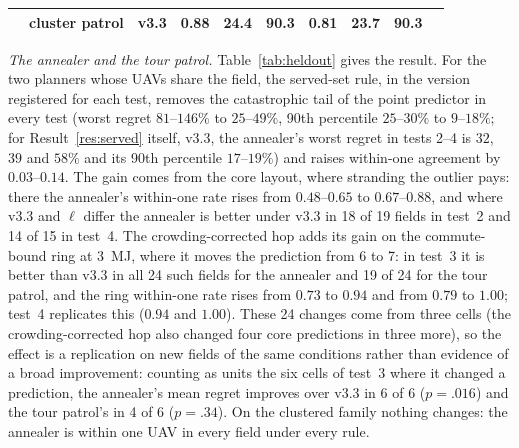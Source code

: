 \documentclass[journal,outdir=./]{IEEEtran}
\begin{document}
\begin{table}[t]
\begin{tabular}{lll rrr rrr l}
 & cluster patrol & v3.3 & 0.88 & 24.4 & 90.3 & 0.81 & 23.7 & 90.3 & \\
\bottomrule
\end{tabular}
\par{}
\end{table}

\textit{The annealer and the tour patrol.} Table~\ref{tab:heldout} gives the result. For the two planners whose UAVs share the field, the served-set rule, in the version registered for each test, removes the catastrophic tail of the point predictor in every test (worst regret $81$--$146\%$ to $25$--$49\%$, 90th percentile $25$--$30\%$ to $9$--$18\%$; for Result~\ref{res:served} itself, v3.3, the annealer's worst regret in tests 2--4 is $32$, $39$ and $58\%$ and its 90th percentile $17$--$19\%$) and raises within-one agreement by $0.03$--$0.14$. The gain comes from the core layout, where stranding the outlier pays: there the annealer's within-one rate rises from $0.48$--$0.65$ to $0.67$--$0.88$, and where v3.3 and $\ell$ differ the annealer is better under v3.3 in 18 of 19 fields in test~2 and 14 of 15 in test~4. The crowding-corrected hop adds its gain on the commute-bound ring at 3~MJ, where it moves the prediction from 6 to 7: in test~3 it is better than v3.3 in all 24 such fields for the annealer and 19 of 24 for the tour patrol, and the ring within-one rate rises from $0.73$ to $0.94$ and from $0.79$ to $1.00$; test~4 replicates this ($0.94$ and $1.00$). These 24 changes come from three cells (the crowding-corrected hop also changed four core predictions in three more), so the effect is a replication on new fields of the same conditions rather than evidence of a broad improvement: counting as units the six cells of test~3 where it changed a prediction, the annealer's mean regret improves over v3.3 in 6 of 6 ($p=.016$) and the tour patrol's in 4 of 6 ($p=.34$). On the clustered family nothing changes: the annealer is within one UAV in every field under every rule.
\end{document}
